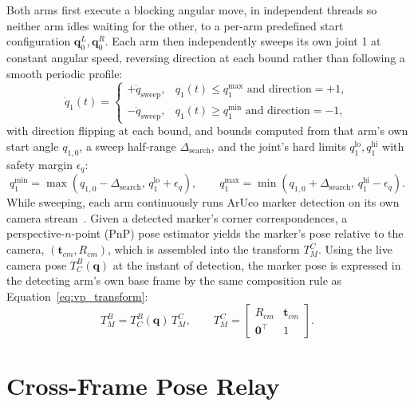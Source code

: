 Both arms first execute a blocking angular move, in independent threads so neither arm idles
waiting for the other, to a per-arm predefined start configuration $\mathbf{q}_0^{L}, \mathbf{q}_0^{R}$.
Each arm then independently sweeps its own joint 1 at constant angular speed, reversing direction at
each bound rather than following a smooth periodic profile:
\begin{equation}
\dot{q}_1(t) =
\begin{cases}
+\dot{q}_{\text{sweep}}, & q_1(t) \leq q_1^{\max} \text{ and direction} = +1, \\
-\dot{q}_{\text{sweep}}, & q_1(t) \geq q_1^{\min} \text{ and direction} = -1,
\end{cases}
\label{eq:sv_search}
\end{equation}
with direction flipping at each bound, and bounds computed from that arm's own start angle
$q_{1,0}$, a sweep half-range $\Delta_{\text{search}}$, and the joint's hard limits
$q_1^{\text{lo}}, q_1^{\text{hi}}$ with safety margin $\epsilon_q$:
\begin{equation}
q_1^{\min} = \max\!\left( q_{1,0} - \Delta_{\text{search}},\, q_1^{\text{lo}} + \epsilon_q \right),
\qquad
q_1^{\max} = \min\!\left( q_{1,0} + \Delta_{\text{search}},\, q_1^{\text{hi}} - \epsilon_q \right).
\label{eq:sv_searchbounds}
\end{equation}
While sweeping, each arm continuously runs ArUco marker detection on its own camera
stream~\citep{garrido2014automatic}. Given a detected marker's corner correspondences, a
perspective-$n$-point (PnP) pose estimator yields the marker's pose relative to the camera,
$(\mathbf{t}_{cm}, R_{cm})$, which is assembled into the transform $T^{C}_{M}$. Using the live
camera pose $T^{B}_{C}(\mathbf{q})$ at the instant of detection, the marker pose is expressed in the
detecting arm's own base frame by the same composition rule as
Equation~\eqref{eq:vp_transform}:
\begin{equation}
T^{B}_{M} = T^{B}_{C}(\mathbf{q})\, T^{C}_{M}, \qquad
T^{C}_{M} = \begin{bmatrix} R_{cm} & \mathbf{t}_{cm} \\ \mathbf{0}^\top & 1 \end{bmatrix}.
\label{eq:sv_marker}
\end{equation}

\section{Cross-Frame Pose Relay}\label{sec:sv_relay}

